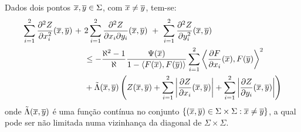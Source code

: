 \begin{lema}
Dados dois pontos $\overline{x},\overline{y}\in\Sigma$, com $\overline{x}\neq\overline{y}$, tem-se:
\begin{equation} \label{eq:lema2Omegaopen}
\begin{aligned}
\sum_{i=1}^2 \frac{\partial^2 Z}{\partial x_i^2}(\xb,\yb) \ + \ & 
2 \sum_{i=1}^2 \frac{\partial^2 Z}{\partial x_i \partial y_i}(\xb,\yb) \ + \ 
\sum_{i=1}^2 \frac{\partial^2 Z}{\partial y_i^2}(\xb,\yb)  \\
& \leq
- \frac{\aleph^2 - 1}{\aleph} \frac{\Psi(\xb)}{1 - \langle F(\xb), F(\yb) \rangle} \sum_{i=1}^2 \left\langle \frac{\partial F}{\partial x_i}(\xb), F(\yb) \right\rangle^2 \\
& + 
\tilde{\Lambda}(\xb,\yb) \left( Z(\xb,\yb) + \sum_{i=1}^2 \left| \frac{\partial Z}{\partial x_i}(\xb,\yb) \right| + \sum_{i=1}^2 \left| \frac{\partial Z}{\partial y_i}(\xb,\yb) \right| \right)
\end{aligned}
\end{equation}
onde $\tilde{\Lambda}(\overline{x},\overline{y})$ \'e uma função cont\'inua no conjunto
$\{(\overline{x},\overline{y})\in\Sigma\times\Sigma:\overline{x}\neq\overline{y} \}$, a qual pode ser não
limitada numa vizinhan\c ca da diagonal de $\Sigma\times\Sigma$.
\end{lema}
